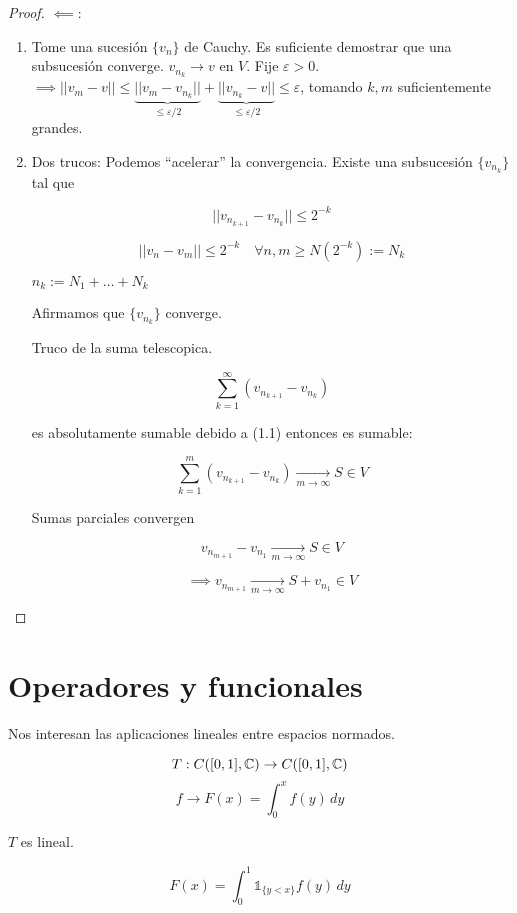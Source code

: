 \documentclass[../Apunte.tex]{subfiles}
\begin{document}
\begin{proof}
    $\impliedby:$ \begin{enumerate}
        \item Tome una sucesión $\{v_n\}$ de Cauchy. Es suficiente demostrar que una subsucesión converge. $v_{n_k}\to v$ en $V$. Fije $\varepsilon>0$.
        $\implies ||v_m-v||\leq \underbrace{||v_m-v_{n_k}||}_{\leq \varepsilon/2}+\underbrace{||v_{n_k}-v||}_{\leq \varepsilon/2}\leq \varepsilon$, tomando $k,m$ suficientemente grandes.

        \item Dos trucos: Podemos ``acelerar'' la convergencia. Existe una subsucesión $\{v_{n_k}\}$ tal que 
        
        \begin{equation}||v_{n_{k+1}}-v_{n_k}||\leq 2^{-k}\end{equation}

        \[||v_n-v_m||\leq 2^{-k}\quad \forall n,m\geq N(2^{-k}):=N_k\]

        $n_k:=N_1+\ldots+N_k$

        Afirmamos que $\{v_{n_k}\}$ converge.

        Truco de la suma telescopica.

        \[\sum_{k=1}^\infty (v_{n_{k+1}}-v_{n_k})\]

        es absolutamente sumable debido a (1.1) entonces es sumable:

        \[\sum_{k=1}^m (v_{n_{k+1}}-v_{n_k})\xrightarrow[m\to\infty]{} S\in V\]

        Sumas parciales convergen 

        \[v_{n_{m+1}}-v_{n_1}\xrightarrow[m\to\infty]{}S\in V\]

        \[\implies v_{n_{m+1}}\xrightarrow[m\to\infty]{}S+v_{n_1}\in V\]

    \end{enumerate}
\end{proof}

\section{Operadores y funcionales}

Nos interesan las aplicaciones lineales entre espacios normados.

\begin{fexample}
    \[T:C([0,1],\mathbb{C})\to C([0,1],\mathbb{C})\]
    \[f\to F(x)=\int_0^x f(y)\, dy\]

    $T$ es lineal.

    \[F(x)=\int_0^1 \mathds{1}_{\{y<x\}} f(y)\,dy\]
\end{fexample}
\end{document}
